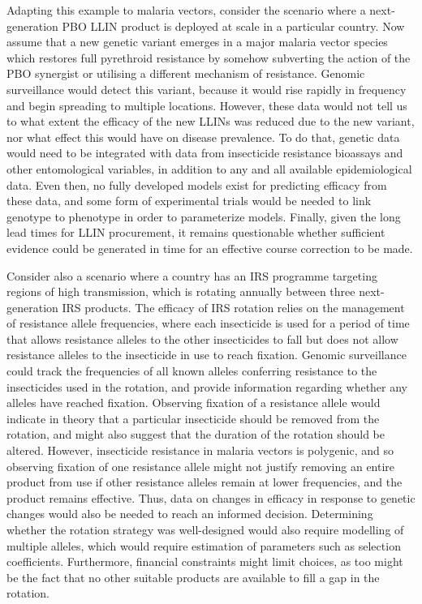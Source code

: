 \begin{refsection}
Adapting this example to malaria vectors, consider the scenario where a next-generation PBO LLIN product is deployed at scale in a particular country.
%
Now assume that a new genetic variant emerges in a major malaria vector species which restores full pyrethroid resistance by somehow subverting the action of the PBO synergist or utilising a different mechanism of resistance.
%
Genomic surveillance would detect this variant, because it would rise rapidly in frequency and begin spreading to multiple locations.
%
However, these data would not tell us to what extent the efficacy of the new LLINs was reduced due to the new variant, nor what effect this would have on disease prevalence.
%
To do that, genetic data would need to be integrated with data from insecticide resistance bioassays and other entomological variables, in addition to any and all available epidemiological data.
%
Even then, no fully developed models exist for predicting efficacy from these data, and some form of experimental trials would be needed to link genotype to phenotype in order to parameterize models.
%
Finally, given the long lead times for LLIN procurement, it remains questionable whether sufficient evidence could be generated in time for an effective course correction to be made.


Consider also a scenario where a country has an IRS programme targeting regions of high transmission, which is rotating annually between three next-generation IRS products.
%
The efficacy of IRS rotation relies on the management of resistance allele frequencies, where each insecticide is used for a period of time that allows resistance alleles to the other insecticides to fall but does not allow resistance alleles to the insecticide in use to reach fixation.
%
Genomic surveillance could track the frequencies of all known alleles conferring resistance to the insecticides used in the rotation, and provide information regarding whether any alleles have reached fixation.
%
Observing fixation of a resistance allele would indicate in theory that a particular insecticide should be removed from the rotation, and might also suggest that the duration of the rotation should be altered.
%
However, insecticide resistance in malaria vectors is polygenic, and so observing fixation of one resistance allele might not justify removing an entire product from use if other resistance alleles remain at lower frequencies, and the product remains effective.
%
Thus, data on changes in efficacy in response to genetic changes would also be needed to reach an informed decision.
%
Determining whether the rotation strategy was well-designed would also require modelling of multiple alleles, which would require estimation of parameters such as selection coefficients.
%
Furthermore, financial constraints might limit choices, as too might be the fact that no other suitable products are available to fill a gap in the rotation.



\end{refsection}
